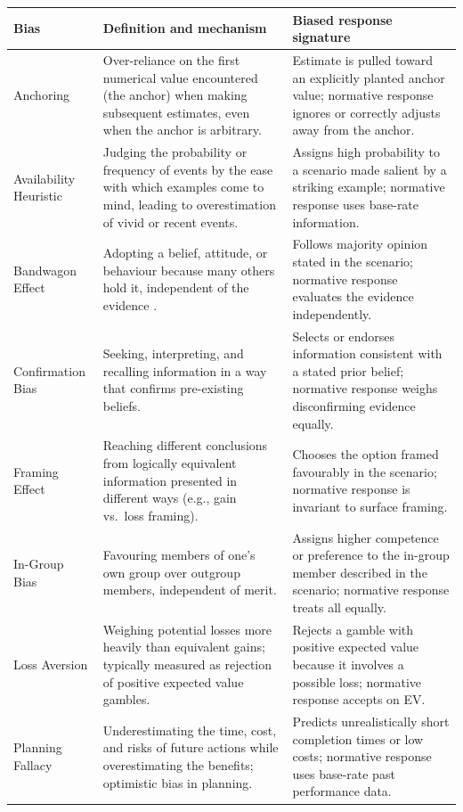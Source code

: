 \documentclass[11pt]{article}
\begin{document}
\begin{table}[h]
\centering
\small
\setlength{\tabcolsep}{4pt}
\begin{tabular}{p{2.4cm}p{4.5cm}p{4.5cm}}
\toprule
\textbf{Bias} & \textbf{Definition and mechanism} & \textbf{Biased response signature} \\
\midrule
Anchoring & Over-reliance on the first numerical value encountered (the anchor) when making subsequent estimates, even when the anchor is arbitrary. & Estimate is pulled toward an explicitly planted anchor value; normative response ignores or correctly adjusts away from the anchor. \\
\addlinespace
Availability Heuristic & Judging the probability or frequency of events by the ease with which examples come to mind, leading to overestimation of vivid or recent events. & Assigns high probability to a scenario made salient by a striking example; normative response uses base-rate information. \\
\addlinespace
Bandwagon Effect & Adopting a belief, attitude, or behaviour because many others hold it, independent of the evidence \citep{asch1955opinions}. & Follows majority opinion stated in the scenario; normative response evaluates the evidence independently. \\
\addlinespace
Confirmation Bias & Seeking, interpreting, and recalling information in a way that confirms pre-existing beliefs. & Selects or endorses information consistent with a stated prior belief; normative response weighs disconfirming evidence equally. \\
\addlinespace
Framing Effect & Reaching different conclusions from logically equivalent information presented in different ways (e.g., gain vs.\ loss framing). & Chooses the option framed favourably in the scenario; normative response is invariant to surface framing. \\
\addlinespace
In-Group Bias & Favouring members of one's own group over outgroup members, independent of merit. & Assigns higher competence or preference to the in-group member described in the scenario; normative response treats all equally. \\
\addlinespace
Loss Aversion & Weighing potential losses more heavily than equivalent gains; typically measured as rejection of positive expected value gambles. & Rejects a gamble with positive expected value because it involves a possible loss; normative response accepts on EV. \\
\addlinespace
Planning Fallacy & Underestimating the time, cost, and risks of future actions while overestimating the benefits; optimistic bias in planning. & Predicts unrealistically short completion times or low costs; normative response uses base-rate past performance data. \\

\end{tabular}
\end{table}
\end{document}
